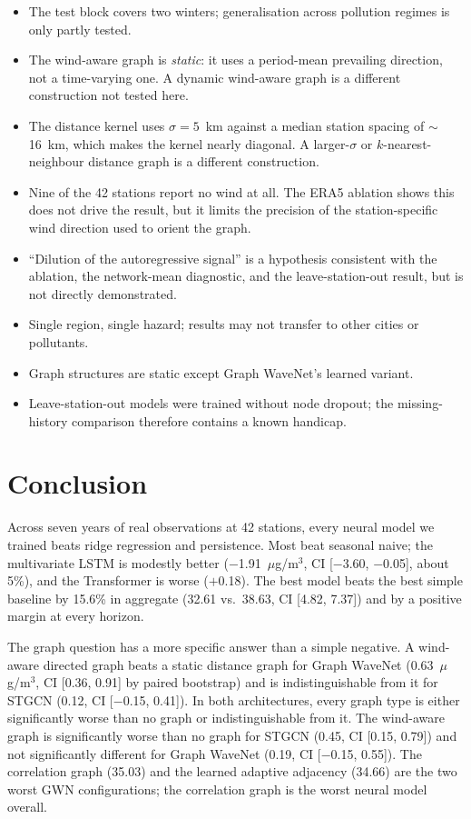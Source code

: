 \documentclass[11pt,a4paper]{article}
\begin{document}
\begin{itemize}
  \item The test block covers two winters; generalisation across pollution
    regimes is only partly tested.
  \item The wind-aware graph is \emph{static}: it uses a period-mean prevailing
    direction, not a time-varying one.  A dynamic wind-aware graph is a
    different construction not tested here.
  \item The distance kernel uses $\sigma=5$~km against a median station spacing
    of $\sim$16~km, which makes the kernel nearly diagonal.  A larger-$\sigma$
    or $k$-nearest-neighbour distance graph is a different construction.
  \item Nine of the 42 stations report no wind at all.  The ERA5 ablation shows
    this does not drive the result, but it limits the precision of the
    station-specific wind direction used to orient the graph.
  \item ``Dilution of the autoregressive signal'' is a hypothesis consistent
    with the ablation, the network-mean diagnostic, and the leave-station-out
    result, but is not directly demonstrated.
  \item Single region, single hazard; results may not transfer to other cities
    or pollutants.
  \item Graph structures are static except Graph WaveNet's learned variant.
  \item Leave-station-out models were trained without node dropout; the
    missing-history comparison therefore contains a known handicap.
\end{itemize}

\section{Conclusion}

Across seven years of real observations at 42 stations, every neural model we
trained beats ridge regression and persistence.  Most beat seasonal naive; the
multivariate LSTM is modestly better ($-$1.91~$\mu$g/m$^3$, CI [$-$3.60,
$-$0.05], about 5\%), and the Transformer is worse ($+$0.18).  The best model
beats the best simple baseline by 15.6\% in aggregate (32.61 vs.\ 38.63,
CI [4.82, 7.37]) and by a positive margin at every horizon.

The graph question has a more specific answer than a simple negative.  A
wind-aware directed graph beats a static distance graph for Graph WaveNet
(0.63~$\mu$g/m$^3$, CI [0.36, 0.91] by paired bootstrap) and is
indistinguishable from it for STGCN (0.12, CI [$-$0.15, 0.41]).
In both architectures, every graph type is either significantly worse than no
graph or indistinguishable from it.  The wind-aware graph is significantly
worse than no graph for STGCN (0.45, CI [0.15, 0.79]) and not significantly
different for Graph WaveNet (0.19, CI [$-$0.15, 0.55]).
The correlation graph (35.03) and the learned adaptive adjacency (34.66) are
the two worst GWN configurations; the correlation graph is the worst neural
model overall.
\end{document}
